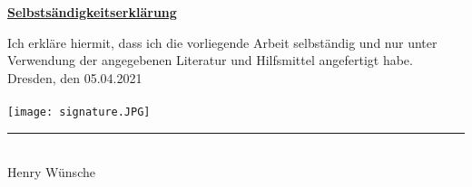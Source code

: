 \begin{center}
\textbf{\underline{Selbstsändigkeitserklärung}}\\
\end{center}
\vspace{0.5cm}
Ich erkläre hiermit, dass ich die vorliegende Arbeit selbständig und nur unter Verwendung der
angegebenen Literatur und Hilfsmittel angefertigt habe.\\

Dresden, den 05.04.2021\\
\vspace{1cm}\\
\texttt{[image: signature.JPG]}\\
\rule[0pt]{6cm}{0.4pt}\\
Henry Wünsche
\vfill